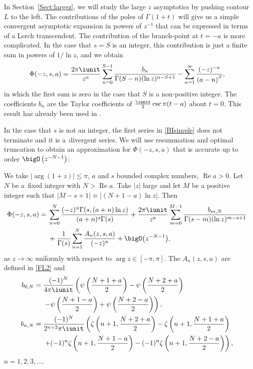 In Section~\ref{Sect:largez}, we will study the large $z$ asymptotics by pushing contour $L$ to the left.
The contributions of the poles of $\Gamma(1+t)$ will give us a simple convergent asymptotic
expansion in powers of $z^{-1}$ that can be expressed in terms of a Lerch transcendent.
The contribution of the branch-point at $t=-a$ is more complicated. In the case that $s=S$ is an integer,
this contribution is just a finite sum in powers of $1/\ln z$, and we obtain
\begin{gather}\label{BIsimple}
 \Phi(-z,s,a)=\frac{2\pi\iunit}{z^{a}}\sum_{n=0}^{S-1}
 \frac{b_n}{\Gamma(S-n)(\ln z)^{n-S+1}}
 -\sum_{n=1}^\infty\frac{(-z)^{-n}}{\left(a-n\right)^S},
\end{gather}
in which the first sum is zero in the case that $S$ is a non-positive integer. The coefficients
$b_n$ are the Taylor coefficients of $\frac{\iunit}2 \csc \pi(t-a)$ about $t=0$.
This result has already been used in \cite[Lemma 3]{NCA2023}.

In the case that $s$ is not an integer, the first series in \eqref{BIsimple} does not terminate
and it is a~divergent series. We will use resummation and optimal truncation to obtain
an approximation for $\Phi(-z,s,a)$ that is accurate up to order
$\bigO\left(z^{-{N-1}}\right)$:

\begin{theorem}\label{thm1}
 We take $|\arg(1+z)|\leq \pi$, $a$ and $s$ bounded complex numbers,
 $\operatorname{Re} a>0$. Let~$N$ be a~fixed integer with $N>\operatorname{Re} a$. Take $|z|$ large and let $M$
 be a positive integer such that $|M-s+1|\approx |(N+1-a)\ln z|$. Then
 \begin{align*}%
 \Phi(-z,s,a)={}& \sum_{n=0}^N \frac{(-z)^n \Gamma(s,(a+n)\ln z)}{(a+n)^s\Gamma(s)}
 +\frac{2\pi\iunit}{z^{a}}\sum_{m=0}^{M-1}
 \frac{b_{m,N}}{\Gamma(s-m)(\ln z)^{m-s+1}}\\
 & +\frac1{\Gamma(s)}\sum_{n=1}^N \frac{A_n(z,s,a)}{%
 (-z)^n}+\bigO\bigl(z^{-N-1}\bigr),
\end{align*}
as $z\to\infty$ uniformly with respect to $\arg z\in[-\pi,\pi]$.
The $A_n(z,s,a)$ are defined in \eqref{FL2} and
\begin{align}
 b_{0,N}={}&\frac{(-1)^N}{4\pi\iunit}\left(\psi\left(\frac{N+1+a}2\right)
 -\psi\left(\frac{N+2+a}2\right)\right.\nonumber\\
 &\left.-\psi\left(\frac{N+1-a}2\right)
 +\psi\left(\frac{N+2-a}2\right)\right),\nonumber\\
 b_{n,N}={}&\frac{(-1)^{N}}{2^{n+2}\pi\iunit}\left(\zeta\left(n+1,\frac{N+2+a}2\right)
 -\zeta\left(n+1,\frac{N+1+a}2\right)\right.\nonumber\\
 &\left.+(-1)^n\zeta\left(n+1,\frac{N+1-a}2\right)
 -(-1)^n\zeta\left(n+1,\frac{N+2-a}2\right)\right),\label{BnN2}
\end{align}
$n=1,2,3,\ldots$.
\end{theorem}

